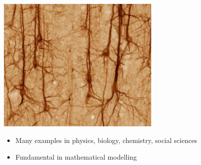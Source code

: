 \documentclass{beamer}
\newcommand{\de}{\mbox{d}}
\newcommand{\rem}[1]{}
\newcommand{\heading}[1]{\centerline{\Large #1} \vspace{0.5em}}
\begin{document}
{\begin{frame}
\begin{minipage}{0.48\textwidth}
\begin{center}
  \includegraphics[draft=false,width=0.6\textwidth]{neuron.jpg}
 \end{center}
\end{minipage}
\vspace{2ex}

\begin{itemize}
 \item Many examples in physics, biology, chemistry, social sciences
 \item Fundamental in mathematical modelling
\end{itemize}

\end{frame}
}


\rem{
\begin{frame}
 
 \heading{What is an ODE?}

 $$\frac{\de x(t)}{\de t} = f\big(x(t) , t\big) \qquad \qquad {\scriptsize \text{short form}} \qquad \dot{x} = f(x,t)
$$

 \begin{itemize}
  \item $x(t)$ -- dependent variable
  \item $t$ -- indenpendent variable (time)
  \item $f(x,t)$ -- defines the ODE
 \end{itemize}

\vspace{4ex}

 Initial Value Problem (IVP):

 $$\dot x = f( x , t ) ,\qquad x(t=0) = x_0$$

\end{frame}
}
\end{document}
